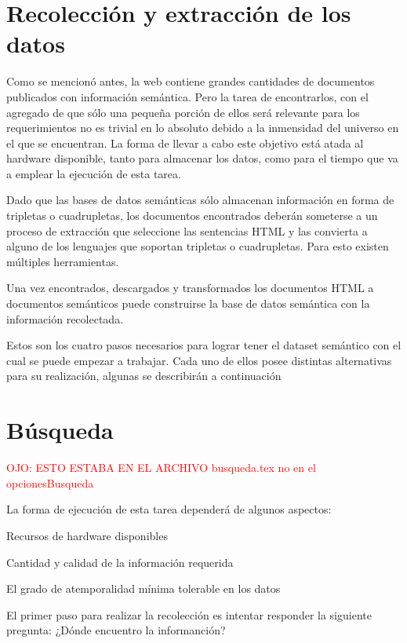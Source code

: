 \section{Recolección y extracción de los datos}

%
Como se mencionó antes, la web contiene grandes cantidades de documentos publicados con información semántica. Pero la tarea
de encontrarlos, con el agregado de que sólo una pequeña porción de ellos será relevante para los requerimientos no es trivial
en lo absoluto debido a la inmensidad del universo en el que se encuentran. La forma de llevar a cabo este objetivo está 
atada al hardware disponible, tanto para almacenar los datos, como para el tiempo que va a emplear la ejecución de esta 
tarea.  

Dado que las bases de datos semánticas sólo almacenan información en forma de tripletas o cuadrupletas, los documentos encontrados 
deberán someterse a un proceso de extracción que seleccione las sentencias HTML y las convierta a alguno de los lenguajes que soportan  
tripletas o cuadrupletas. Para esto existen múltiples herramientas. 

Una vez encontrados, descargados y transformados los documentos HTML a documentos semánticos puede construirse la base de datos semántica 
con la información recolectada. 

Estos son los cuatro pasos necesarios para lograr tener el dataset semántico con el cual se puede empezar a trabajar. Cada uno de ellos 
posee distintas alternativas para su realización, algunas se describirán a continuación 



\section{Búsqueda}
%
\textcolor{red}{OJO: ESTO ESTABA EN EL ARCHIVO busqueda.tex no en el opcionesBusqueda}


La forma de ejecución de esta tarea dependerá de algunos aspectos:

Recursos de hardware disponibles

Cantidad y calidad de la información requerida

El grado de atemporalidad mínima tolerable en los datos

El primer paso para realizar la recolección es intentar responder la siguiente pregunta: ¿Dónde encuentro la informanción?

